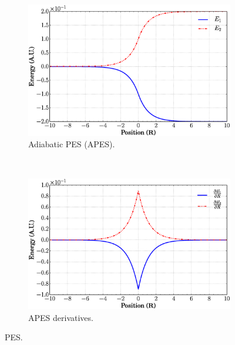 \documentclass[xetex,mathserif,serif]{beamer}
\begin{document}
\begin{frame}
{\begin{figure}
\begin{subfigure}[t]{0.45\textwidth}
\includegraphics[width=\textwidth]{aecpes.eps}
\vspace{-0.25cm}
\caption{Adiabatic PES (APES).}
\label{f:apesec}
\end{subfigure}
~
\begin{subfigure}[t]{0.45\textwidth}
\centering
\includegraphics[width=\textwidth]{daecpes.eps}
\vspace{-0.25cm}
\caption{APES derivatives.}
\label{f:dapesec}
\end{subfigure}
\vspace{-0.45cm}
\caption{PES.}
\end{figure}
}
\end{frame}
\end{document}
